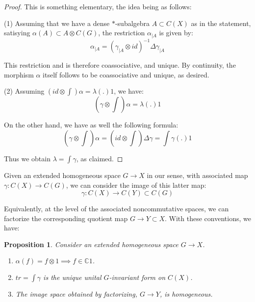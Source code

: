 \documentclass[12pt]{amsbook}
\newtheorem{proposition}[theorem]{Proposition}
\begin{document}
\begin{proof}
This is something elementary, the idea being as follows:

\medskip

(1) Assuming that we have a dense $*$-subalgebra $A\subset C(X)$ as in the statement, satisying $\alpha(A)\subset A\otimes C(G)$, the restriction $\alpha_{|A}$ is given by:
$$\alpha_{|A}=(\gamma_{|A}\otimes id)^{-1}\Delta\gamma_{|A}$$

This restriction and is therefore coassociative, and unique. By continuity, the morphism $\alpha$ itself follows to be coassociative and unique, as desired.

\medskip

(2) Assuming $(id\otimes\int)\alpha=\lambda(.)1$, we have:
$$\left(\gamma\otimes\int\right)\alpha=\lambda(.)1$$

On the other hand, we have as well the following formula:
$$\left(\gamma\otimes\int\right)\alpha=\left(id\otimes\int\right)\Delta\gamma=\int\gamma(.)1$$

Thus we obtain $\lambda=\int\gamma$, as claimed.
\end{proof}

Given an extended homogeneous space $G\to X$ in our sense, with associated map $\gamma:C(X)\to C(G)$, we can consider the image of this latter map:
$$\gamma:C(X)\to C(Y)\subset C(G)$$

Equivalently, at the level of the associated noncommutative spaces, we can factorize the corresponding quotient map $G\to Y\subset X$. With these conventions, we have:

\begin{proposition}
Consider an extended homogeneous space $G\to X$.
\begin{enumerate}
\item $\alpha(f)=f\otimes 1\implies f\in\mathbb C1$.

\item $tr=\int\gamma$ is the unique unital $G$-invariant form on $C(X)$.

\item The image space obtained by factorizing, $G\to Y$, is homogeneous.
\end{enumerate}
\end{proposition}
\end{document}
